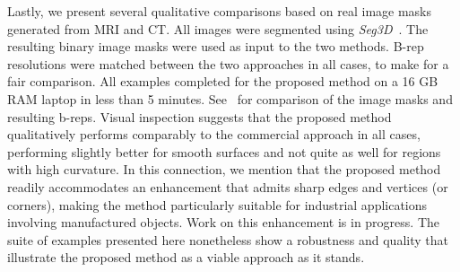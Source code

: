 Lastly, we present several qualitative comparisons based on real image masks generated from MRI and CT.  All images were segmented using \textit{Seg3D}~\cite{Seg3D}. The resulting binary image masks were used as input to the two methods. B-rep resolutions were matched between the two approaches in all cases, to make for a fair comparison. All examples completed for the proposed method on a 16 GB RAM laptop in less than 5 minutes. See~ for comparison of the image masks and resulting b-reps. Visual inspection suggests that the proposed method qualitatively performs comparably to the commercial approach in all cases, performing slightly better for smooth surfaces and not quite as well for regions with high curvature.  In this connection, we mention that the proposed method readily accommodates an enhancement that admits sharp edges and vertices (or corners), making the method particularly suitable for industrial applications involving manufactured objects.  Work on this enhancement is in progress.  The suite of examples presented here nonetheless show a robustness and quality that illustrate the proposed method as a viable approach as it stands.
